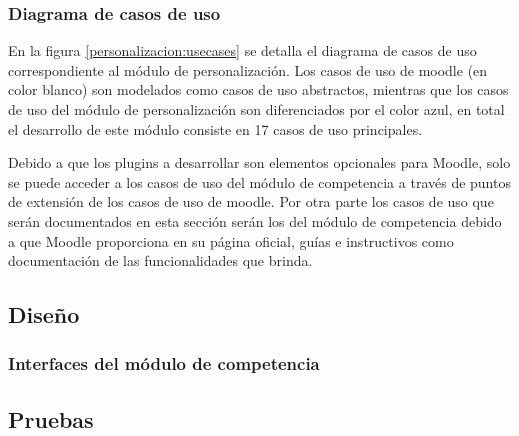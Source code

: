 \subsubsection*{Diagrama de casos de uso}

 En la figura \ref{personalizacion:usecases} se detalla el diagrama de casos de uso correspondiente al módulo
 de personalización. Los casos de uso de moodle (en color blanco) son modelados como casos de uso
 abstractos, mientras que los casos de uso del módulo de personalización son diferenciados por el
 color azul, en total el desarrollo de este módulo consiste en 17 casos de uso principales.


 \noindent
 Debido a que los plugins a desarrollar son elementos opcionales para Moodle, solo se puede
 acceder a los casos de uso del módulo de competencia a través de puntos de extensión de los
 casos de uso de moodle. Por otra parte los casos de uso que serán documentados en esta sección
 serán los del módulo de competencia debido a que Moodle proporciona en su página oficial, guías
 e instructivos como documentación de las funcionalidades que brinda.



\clearpage
\subsection{Diseño}

\subsubsection{Interfaces del módulo de competencia}

    
    
    
    





\subsection{Pruebas}

